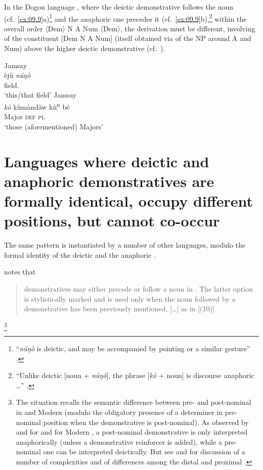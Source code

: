 \documentclass[output=paper]{langsci/langscibook}
\begin{document}
In the Dogon language , where the deictic demonstrative follows
the noun (cf.~\ref{ex:09.9}a)\footnote{\enquote{\emph{núŋò} is deictic, and may be
accompanied by pointing or a similar gesture} \parencite[162]{Heath2008}.} and
the anaphoric one precedes it (cf.~\ref{ex:09.9}b),\footnote{\enquote{Unlike deictic
[noun + \emph{núŋò}], the phrase [\emph{kò} + noun] is discourse anaphoric
\dots{}} \parencite[164]{Heath2008}.} within the overall order
〈Dem〉 N A Num 〈Dem〉, the derivation must be
different, involving  of the constituent [Dem N A Num]
(itself obtained via  of the NP around A and Num) above the higher
deictic demonstrative (cf.\  \citealt{Cinque2005,Cinque2017}).

\ea\label{ex:09.9}
	\ea Jamsay \parencite[161]{Heath2008}\\
		\gll èjù  \textit{núŋò}\\
                field.\Ll{} {\Dem{}}\\
		\glt ‘this/that field’
	\ex Jamsay \parencite[164]{Heath2008}\\
		\gll \textit{kò}  kùmàndâw kù\textsuperscript{n} bé\\
            {\Dem{}} Major \textsc{def} \textsc{pl}\\
		\glt ‘those (aforementioned) Majors’
	\z
\z

\section{Languages where deictic and anaphoric demonstratives are formally
identical, occupy different positions, but cannot co-occur}

The same pattern is instantiated by a number of other languages, modulo the
formal identity of the deictic and the anaphoric .

\textcite[142]{Migdalski2001} notes that \blockquote{demonstratives may either
    precede or follow a noun in . The latter option is
    stylistically marked and is used only when the noun followed by a
    demonstrative has been previously mentioned, [\dots{}] as in
    [(10)]}:\footnote{The  situation recalls the semantic difference
    between pre- and post-nominal  in  and Modern
    (modulo the obligatory presence of a determiner in pre-nominal position
    when the demonstrative is post-nominal). As observed by
    \citet{Bernstein1997} and \citet{Taboada2007} for  and
    \citet{Panagiotidis2000} for Modern , a post-nominal
    demonstrative is only interpreted anaphorically (unless a demonstrative
    reinforcer is added), while a pre-nominal one can be interpreted
    deictically. But see \textcite[50, n.\ 27]{Bruge2002} and \textcite[§2.5.3,
p.\ 167, n.\ 51]{Bruge2000} for discussion of a number of complexities and of
differences among the  distal and proximal .}
\end{document}
